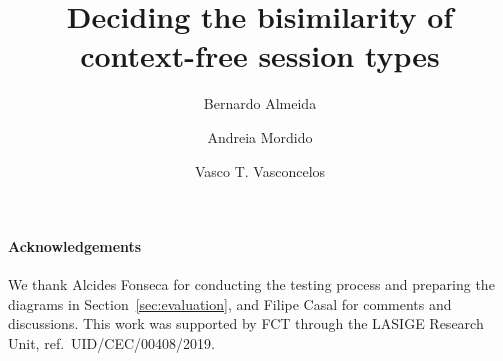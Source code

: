 \documentclass[orivec,runningheads]{llncs}
\begin{document}
\title{Deciding the bisimilarity of context-free session types
}


\author{Bernardo Almeida \and
Andreia Mordido \and
Vasco T. Vasconcelos}

%
%



%
%
%


\maketitle










\paragraph{Acknowledgements}
  We thank Alcides Fonseca for conducting the testing process and
  preparing the diagrams in Section~\ref{sec:evaluation}, and Filipe
  Casal for comments and discussions.
%
  This work was supported by FCT through the LASIGE Research Unit,
  ref.\ UID/CEC/00408/2019.




\newpage 
\appendix

%
%
%
%
\end{document}

